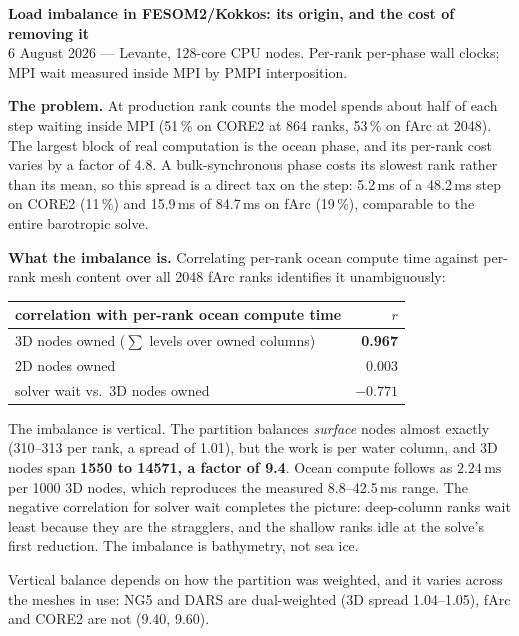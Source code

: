 \documentclass[10pt,a4paper]{article}
\begin{document}
{\large\bfseries Load imbalance in FESOM2/Kokkos: its origin, and the cost of removing it}\\[1pt]
{\small 6 August 2026 --- Levante, 128-core CPU nodes. Per-rank per-phase wall clocks;
MPI wait measured inside MPI by PMPI interposition.}

\textbf{The problem.} At production rank counts the model spends about half of each step
waiting inside MPI (51\,\% on CORE2 at 864 ranks, 53\,\% on fArc at 2048). The largest block
of real computation is the ocean phase, and its per-rank cost varies by a factor of 4.8. A
bulk-synchronous phase costs its slowest rank rather than its mean, so this spread is a direct
tax on the step: 5.2\,ms of a 48.2\,ms step on CORE2 (11\,\%) and 15.9\,ms of 84.7\,ms on fArc
(19\,\%), comparable to the entire barotropic solve.

\textbf{What the imbalance is.} Correlating per-rank ocean compute time against per-rank mesh
content over all 2048 fArc ranks identifies it unambiguously:

\begin{center}\vspace{-4pt}\footnotesize
\begin{tabular}{lr}
\toprule
correlation with per-rank ocean compute time & $r$ \\
\midrule
3D nodes owned ($\sum$ levels over owned columns) & \textbf{0.967} \\
2D nodes owned & 0.003 \\
solver wait vs.\ 3D nodes owned & $-0.771$ \\
\bottomrule
\end{tabular}\vspace{-4pt}
\end{center}

\noindent
The imbalance is vertical. The partition balances \emph{surface} nodes almost exactly (310--313
per rank, a spread of 1.01), but the work is per water column, and 3D nodes span
\textbf{1550 to 14571, a factor of 9.4}. Ocean compute follows as
$2.24\,\mathrm{ms}$ per 1000 3D nodes, which reproduces the measured 8.8--42.5\,ms range. The
negative correlation for solver wait completes the picture: deep-column ranks wait least
because they are the stragglers, and the shallow ranks idle at the solve's first reduction.
The imbalance is bathymetry, not sea ice.

Vertical balance depends on how the partition was weighted, and it varies across the meshes in
use: NG5 and DARS are dual-weighted (3D spread 1.04--1.05), fArc and CORE2 are not (9.40, 9.60).
\end{document}
